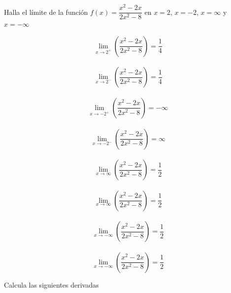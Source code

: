 \documentclass[addpoints,spanish, 12pt,a4paper]{exam}
\begin{document}
\begin{questions}

\question[2] Halla el límite de la función $f(x)=\dfrac{x^{2} - 2 x}{2 x^{2} - 8}$ en $x=2$, $x=-2$, $x=\infty$ y $x=-\infty$  


\begin{solution}
$$\lim_{x \to 2^+}\left(\frac{x^{2} - 2 x}{2 x^{2} - 8}\right)=\frac{1}{4}$$ \\ $$\lim_{x \to 2^-}\left(\frac{x^{2} - 2 x}{2 x^{2} - 8}\right)=\frac{1}{4}$$ \\ $$\lim_{x \to -2^+}\left(\frac{x^{2} - 2 x}{2 x^{2} - 8}\right)=-\infty$$ \\ $$\lim_{x \to -2^-}\left(\frac{x^{2} - 2 x}{2 x^{2} - 8}\right)=\infty$$ \\ $$\lim_{x \to \infty}\left(\frac{x^{2} - 2 x}{2 x^{2} - 8}\right)=\frac{1}{2}$$ \\ $$\lim_{x \to \infty}\left(\frac{x^{2} - 2 x}{2 x^{2} - 8}\right)=\frac{1}{2}$$ \\ $$\lim_{x \to -\infty}\left(\frac{x^{2} - 2 x}{2 x^{2} - 8}\right)=\frac{1}{2}$$ \\ $$\lim_{x \to -\infty}\left(\frac{x^{2} - 2 x}{2 x^{2} - 8}\right)=\frac{1}{2}$$

\end{solution}


\addpoints

\question Calcula las siguientes derivadas 



\end{questions}
\end{document}

